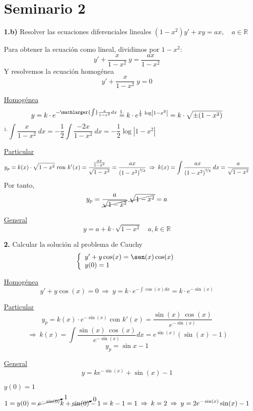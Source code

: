 \section{Seminario 2}
\begin{ejer}
    \textbf{1.b)} Resolver las ecuaciones diferenciales lineales $(1-x^2)y' + xy = ax,  \quad a \in \mathbb R$
\end{ejer}\begin{sol}
    Para obtener la ecuación como lineal, dividimos por $1-x^2$:
    $$y'+\dfrac{x}{1-x^2} \: y=\dfrac{ax}{1-x^2}$$
    Y resolvemos la ecuación homogénea
    $$y'+\dfrac{x}{1-x^2} \: y=0$$
    
    \underline{Homogénea}
    $$y=k \cdot e^{-\mathlarger{\int} \frac{x}{1-x^2} dx}\overset{1.}{=}k \cdot e^{\frac{1}{2} \: \log\left|1-x^2\right|}=k \cdot \sqrt{\pm (1-x^2)}$$
    $$^{1.} \int \dfrac{x}{1-x^2} \: dx=-\dfrac{1}{2} \int \dfrac{-2x}{1-x^2} \: dx=-\dfrac{1}{2}\log|1-x^2| \qquad \qquad \qquad \qquad \qquad \qquad \qquad \qquad$$
    
    \underline{Particular}
    $$y_p=k(x)\cdot\sqrt{1-x^2} \text{ con } k'(x)=\dfrac{\frac{ax}{1-x^2}}{\sqrt{1-x^2}}=\dfrac{ax}{\left(1-x^2\right)^{\nicefrac{3}{2}}} \: \Rightarrow \: k(x)=\int \dfrac{ax}{\left(1-x^2\right)^{\nicefrac{3}{2}}} \: dx= \dfrac{a}{\sqrt{1-x^2}}$$
    Por tanto, $$y_p=\dfrac{a}{\cancel{\sqrt{1-x^2}}} \: \cancel{\sqrt{1-x^2}}=a$$

    \underline{General}
$$y=a+k \cdot \sqrt{1-x^2} \quad a,k \in \mathbb R$$
    
\end{sol}
\begin{ejer}
    \textbf{2.} Calcular la solución al problema de Cauchy
    $$\left\{ \begin{array}{l}
         y' + y \cos(x) = \sen(x) \cos(x)  \\
         y(0)=1
    \end{array}\right.$$
\end{ejer}
\begin{sol}

    \underline{Homogénea}
    $$y' + y \cos(x) = 0 \: \Rightarrow \: y=k \cdot e^{-\int \cos(x) dx}=k \cdot e^{-\sin(x)}$$

    \underline{Particular}
    $$y_p=k(x) \cdot e^{-\sin(x)} \text{ con } k'(x)=\dfrac{\sin(x) \: \cos(x)}{e^{-\sin(x)}} $$
    $$\: \Rightarrow \: k(x)=\int \dfrac{\sin(x) \: \cos(x)}{e^{-\sin(x)}}dx = e^{\sin(x)}(\sin(x)-1)$$
    $$y_p=\sin x -1$$

    \underline{General}
    $$y=k e^{-\sin(x)}  +\sin(x)-1$$

    \underline{$y(0)=1$}
    $$1=y(0)=\cancelto{1}{e^{-\sin(0)}} k + \cancelto{0}{\sin(0)}-1=k-1=1 \: \Rightarrow \: k=2 \: \Rightarrow \: y=2e^{-\sin(x)} \sin(x)-1$$
    
\end{sol}
